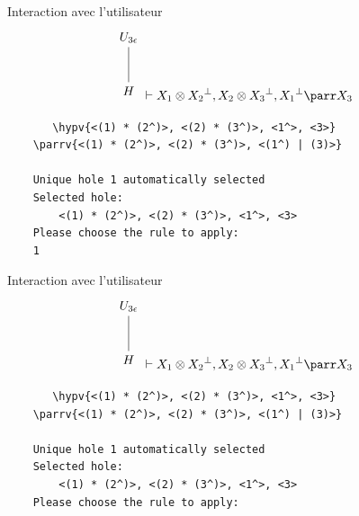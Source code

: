 \documentclass{beamer}
\newcommand*{\orth}{^\perp}
\newcommand*{\tensor}{\otimes}
\newcommand*{\hypv}[1]{\hypo{\vdash #1}}
\newcommand*{\parrv}[1]{\infer{1}[\ensuremath{\parr}]{\vdash #1}}
\newcommand*{\unknown}{H}
\begin{document}
\begin{frame}[containsverbatim]{Interaction avec l'utilisateur}
    \begin{equation*}
        \begin{tikzpicture}%
            [level 2/.style={sibling distance=3.5cm}]
            \node {$U_{3 \epsilon}$}
            child {node {$\unknown$}
            };
        \end{tikzpicture} \vdash X_1 \tensor {X_2}\orth, X_2 \tensor {X_3}\orth, {X_1}\orth \parr X_3
    \end{equation*}

    \begin{verbatim}
       \hypv{<(1) * (2^)>, <(2) * (3^)>, <1^>, <3>}
    \parrv{<(1) * (2^)>, <(2) * (3^)>, <(1^) | (3)>}

    Unique hole 1 automatically selected
    Selected hole: 
        <(1) * (2^)>, <(2) * (3^)>, <1^>, <3>
    Please choose the rule to apply:
    1
    \end{verbatim}
\end{frame}

\begin{frame}[containsverbatim]{Interaction avec l'utilisateur}
    \begin{equation*}
        \begin{tikzpicture}%
            [level 2/.style={sibling distance=3.5cm}]
            \node {$U_{3 \epsilon}$}
            child {node {$\unknown$}
            };
        \end{tikzpicture} \vdash X_1 \tensor {X_2}\orth, X_2 \tensor {X_3}\orth, {X_1}\orth \parr X_3
    \end{equation*}

    \begin{verbatim}
       \hypv{<(1) * (2^)>, <(2) * (3^)>, <1^>, <3>}
    \parrv{<(1) * (2^)>, <(2) * (3^)>, <(1^) | (3)>}

    Unique hole 1 automatically selected
    Selected hole: 
        <(1) * (2^)>, <(2) * (3^)>, <1^>, <3>
    Please choose the rule to apply:
    \end{verbatim}
\end{frame}
\end{document}
